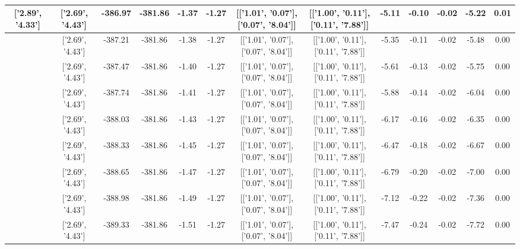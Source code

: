 \begin{table}[htbp]
\begin{adjustbox}{angle=90}
\begin{tabular}{|c|c|c|c|c|c|c|c|c|c|c|c|c|}
 ['2.89', '4.33'] & ['2.69', '4.43'] & -386.97 & -381.86 & -1.37 & -1.27 & [['1.01', '0.07'], ['0.07', '8.04']] & [['1.00', '0.11'], ['0.11', '7.88']] & -5.11 & -0.10 & -0.02 & -5.22 & 0.01\\ \hline
 ['2.90', '4.33'] & ['2.69', '4.43'] & -387.21 & -381.86 & -1.38 & -1.27 & [['1.01', '0.07'], ['0.07', '8.04']] & [['1.00', '0.11'], ['0.11', '7.88']] & -5.35 & -0.11 & -0.02 & -5.48 & 0.00\\ \hline
 ['2.92', '4.32'] & ['2.69', '4.43'] & -387.47 & -381.86 & -1.40 & -1.27 & [['1.01', '0.07'], ['0.07', '8.04']] & [['1.00', '0.11'], ['0.11', '7.88']] & -5.61 & -0.13 & -0.02 & -5.75 & 0.00\\ \hline
 ['2.93', '4.32'] & ['2.69', '4.43'] & -387.74 & -381.86 & -1.41 & -1.27 & [['1.01', '0.07'], ['0.07', '8.04']] & [['1.00', '0.11'], ['0.11', '7.88']] & -5.88 & -0.14 & -0.02 & -6.04 & 0.00\\ \hline
 ['2.94', '4.31'] & ['2.69', '4.43'] & -388.03 & -381.86 & -1.43 & -1.27 & [['1.01', '0.07'], ['0.07', '8.04']] & [['1.00', '0.11'], ['0.11', '7.88']] & -6.17 & -0.16 & -0.02 & -6.35 & 0.00\\ \hline
 ['2.96', '4.30'] & ['2.69', '4.43'] & -388.33 & -381.86 & -1.45 & -1.27 & [['1.01', '0.07'], ['0.07', '8.04']] & [['1.00', '0.11'], ['0.11', '7.88']] & -6.47 & -0.18 & -0.02 & -6.67 & 0.00\\ \hline
 ['2.97', '4.30'] & ['2.69', '4.43'] & -388.65 & -381.86 & -1.47 & -1.27 & [['1.01', '0.07'], ['0.07', '8.04']] & [['1.00', '0.11'], ['0.11', '7.88']] & -6.79 & -0.20 & -0.02 & -7.00 & 0.00\\ \hline
 ['2.98', '4.29'] & ['2.69', '4.43'] & -388.98 & -381.86 & -1.49 & -1.27 & [['1.01', '0.07'], ['0.07', '8.04']] & [['1.00', '0.11'], ['0.11', '7.88']] & -7.12 & -0.22 & -0.02 & -7.36 & 0.00\\ \hline
 ['2.99', '4.28'] & ['2.69', '4.43'] & -389.33 & -381.86 & -1.51 & -1.27 & [['1.01', '0.07'], ['0.07', '8.04']] & [['1.00', '0.11'], ['0.11', '7.88']] & -7.47 & -0.24 & -0.02 & -7.72 & 0.00\\ \hline
            \end{tabular}
        \end{adjustbox}
        \caption{}
        \label{}
    \end{table}
    